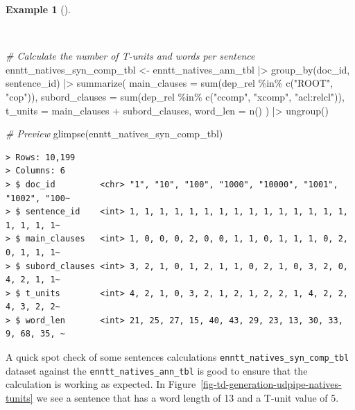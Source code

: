 \documentclass[
  letterpaper,
]{latex/krantz}
\newenvironment{Shaded}{\begin{snugshade}}{\end{snugshade}}
\newcommand{\AttributeTok}[1]{\textcolor[rgb]{0.00,0.00,0.00}{#1}}
\newcommand{\CommentTok}[1]{\textcolor[rgb]{0.00,0.00,0.00}{\textit{#1}}}
\newcommand{\FunctionTok}[1]{\textcolor[rgb]{0.00,0.00,0.00}{#1}}
\newcommand{\NormalTok}[1]{\textcolor[rgb]{0.00,0.00,0.00}{#1}}
\newcommand{\OtherTok}[1]{\textcolor[rgb]{0.00,0.00,0.00}{#1}}
\newcommand{\SpecialCharTok}[1]{\textcolor[rgb]{0.00,0.00,0.00}{#1}}
\newcommand{\StringTok}[1]{\textcolor[rgb]{0.00,0.00,0.00}{#1}}
\theoremstyle{definition}
\newtheorem{example}{Example}[chapter]
\theoremstyle{remark}
\begin{document}
\begin{example}[]\protect\hypertarget{exm-td-generation-udpipe-natives-tunits-words}{}\label{exm-td-generation-udpipe-natives-tunits-words}

~

\begin{Shaded}
\begin{Highlighting}[]
\CommentTok{\# Calculate the number of T{-}units and words per sentence}
\NormalTok{enntt\_natives\_syn\_comp\_tbl }\OtherTok{\textless{}{-}}
\NormalTok{  enntt\_natives\_ann\_tbl }\SpecialCharTok{|\textgreater{}}
  \FunctionTok{group\_by}\NormalTok{(doc\_id, sentence\_id) }\SpecialCharTok{|\textgreater{}}
  \FunctionTok{summarize}\NormalTok{(}
    \AttributeTok{main\_clauses =} \FunctionTok{sum}\NormalTok{(dep\_rel }\SpecialCharTok{\%in\%} \FunctionTok{c}\NormalTok{(}\StringTok{"ROOT"}\NormalTok{, }\StringTok{"cop"}\NormalTok{)),}
    \AttributeTok{subord\_clauses =} \FunctionTok{sum}\NormalTok{(dep\_rel }\SpecialCharTok{\%in\%} \FunctionTok{c}\NormalTok{(}\StringTok{"ccomp"}\NormalTok{, }\StringTok{"xcomp"}\NormalTok{, }\StringTok{"acl:relcl"}\NormalTok{)),}
    \AttributeTok{t\_units =}\NormalTok{ main\_clauses }\SpecialCharTok{+}\NormalTok{ subord\_clauses,}
    \AttributeTok{word\_len =} \FunctionTok{n}\NormalTok{()}
\NormalTok{  ) }\SpecialCharTok{|\textgreater{}}
  \FunctionTok{ungroup}\NormalTok{()}

\CommentTok{\# Preview}
\FunctionTok{glimpse}\NormalTok{(enntt\_natives\_syn\_comp\_tbl)}
\end{Highlighting}
\end{Shaded}

\begin{verbatim}
> Rows: 10,199
> Columns: 6
> $ doc_id         <chr> "1", "10", "100", "1000", "10000", "1001", "1002", "100~
> $ sentence_id    <int> 1, 1, 1, 1, 1, 1, 1, 1, 1, 1, 1, 1, 1, 1, 1, 1, 1, 1, 1~
> $ main_clauses   <int> 1, 0, 0, 0, 2, 0, 0, 1, 1, 0, 1, 1, 1, 0, 2, 0, 1, 1, 1~
> $ subord_clauses <int> 3, 2, 1, 0, 1, 2, 1, 1, 0, 2, 1, 0, 3, 2, 0, 4, 2, 1, 1~
> $ t_units        <int> 4, 2, 1, 0, 3, 2, 1, 2, 1, 2, 2, 1, 4, 2, 2, 4, 3, 2, 2~
> $ word_len       <int> 21, 25, 27, 15, 40, 43, 29, 23, 13, 30, 33, 9, 68, 35, ~
\end{verbatim}

\end{example}

A quick spot check of some sentences calculations
\texttt{enntt\_natives\_syn\_comp\_tbl} dataset against the
\texttt{enntt\_natives\_ann\_tbl} is good to ensure that the calculation
is working as expected. In
Figure~\ref{fig-td-generation-udpipe-natives-tunits} we see a sentence
that has a word length of 13 and a T-unit value of 5.
\end{document}
